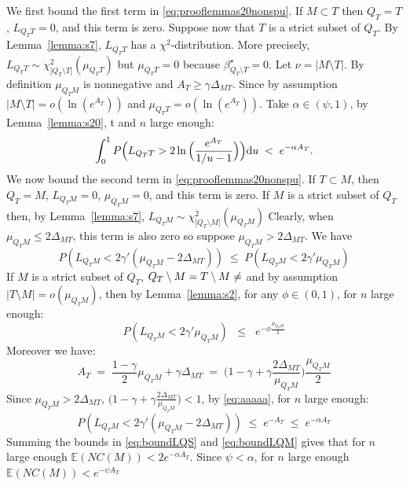 \documentclass[aos]{imsart}
\theoremstyle{plain}
\newcommand{\E}{\mathbb{E}}
\begin{document}
We first bound the first term in \eqref{eq:prooflemmas20nonspu}. If $M \subset T$ then $Q_T=T$, $L_{Q_TT}=0$, and this term is zero. Suppose now that $T$ is a strict subset of $Q_T$. By Lemma~\ref{lemma:s7}, $L_{Q_TT}$ has a $\chi^2$-distribution. More precisely, $L_{Q_TT} \sim \mathcal{\chi}_{|Q_T\setminus T|}^2(\mu_{Q_TT})$ {but $\mu_{Q_TT}=0$ because $\beta^\star_{Q_T\setminus T}=0$}. Let $\nu=|M\setminus T|$. By definition $\mu_{Q_TM}$ is nonnegative and $A_T \geq \gamma \Delta_{MT}$. Since by assumption $|M\setminus T|=o(\ln(e^{A_T}))$ and $\mu_{Q_TT}=o(\ln(e^{A_T}))$. Take $\alpha\in(\psi,1)$, by Lemma~\ref{lemma:s20}, t and $n$ large enough:
\begin{equation}\label{eq:boundLQS}
\int_0^1P\Bigl(L_{Q_TT}>2\ln{\Bigl(\frac{e^{A_T}}{1 / u-1}\Bigl)}\Bigl){\rm d}u \;<\; 
e^{-\alpha A_T}.
\end{equation}
We now bound the second term in \eqref{eq:prooflemmas20nonspu}. If $T \subset M$, then $Q_T=M$, $L_{Q_TM}=0$, $\mu_{Q_TM}=0$, and this term is zero. If $M$ is a strict subset of $Q_T$ then, by Lemma~\ref{lemma:s7}, $L_{Q_TM} \sim \chi_{|Q_T\setminus M|}^2(\mu_{Q_TM})$ %
Clearly, when $\mu_{Q_TM}\leq 2\Delta_{MT}$, this term is also zero so suppose  $\mu_{Q_TM}> 2\Delta_{MT}$.  
We have  
$$P\left(L_{Q_TM}<2\gamma'(\mu_{Q_TM}-2\Delta_{MT})\right)\; \leq \; P\left(L_{Q_TM}<2\gamma'\mu_{Q_TM}\right)$$ 
If $M$ is a strict subset of $Q_T$,   $Q_T\setminus M=T\setminus M\neq \empty$ and by assumption $|T\setminus M|=o(\mu_{Q_TM})$, then by Lemma~\ref{lemma:s2}, for any $\phi\in(0,1)$, for $n$ large enough:
\begin{equation}\label{eq:aaaaa}
    P\left(L_{Q_TM}<2\gamma'\mu_{Q_TM}\right) \;\;\leq\;\; e^{-\phi\frac{\mu_{Q_TM}}{2}}
\end{equation}
Moreover we have:
$$
A_T\;=\;\frac{1-\gamma}{2}\mu_{Q_TM}+\gamma\Delta_{MT}\;=\;\Big(1-\gamma+\gamma\frac{2\Delta_{MT}}{\mu_{Q_TM}}\Big)\frac{\mu_{Q_TM}}{2}
$$
Since $\mu_{Q_TM}>2\Delta_{MT}$, $\big(1-\gamma+\gamma\frac{2\Delta_{MT}}{\mu_{Q_TM}}\big)<1$, by \eqref{eq:aaaaa}, for $n$ large enough:
\begin{equation}\label{eq:boundLQM}
    P\left(L_{Q_TM}<2\gamma'(\mu_{Q_TM}-2\Delta_{MT})\right) \;\leq\; e^{-A_T} \;\leq\; e^{-\alpha A_T}
\end{equation}
Summing the bounds in \eqref{eq:boundLQS} and \eqref{eq:boundLQM} gives that for $n$ large enough $\E\left(NC(M)\right) < 2e^{-\alpha A_T}$. Since $\psi<\alpha$, for $n$ large enough $\E\left(NC(M)\right) < e^{-\psi A_T}$
\end{document}
